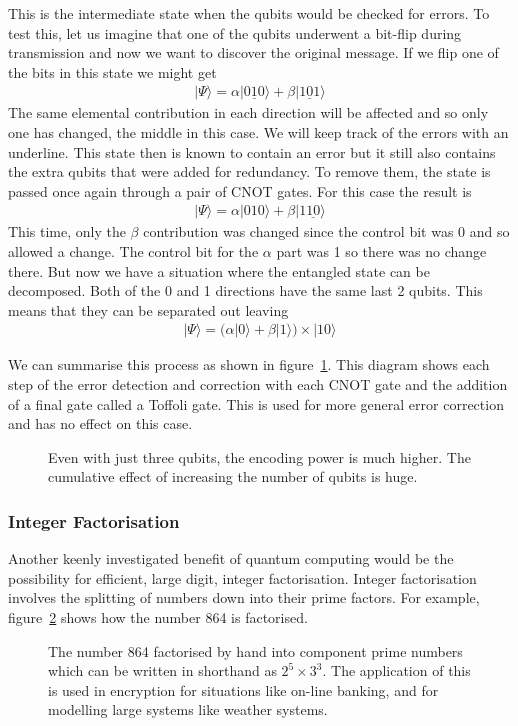 This is the intermediate state when the qubits would be checked for errors. To test this, let us imagine that one of the qubits underwent a bit-flip during transmission and now we want to discover the original message. If we flip one of the bits in this state we might get
\begin{align}
	|\Psi\rangle = \alpha|0\underline{1}0\rangle + \beta|1\underline{0}1\rangle
\end{align}
The same elemental contribution in each direction will be affected and so only one has changed, the middle in this case. We will keep track of the errors with an underline. This state then is known to contain an error but it still also contains the extra qubits that were added for redundancy. To remove them, the state is passed once again through a pair of CNOT gates. For this case the result is
\begin{align}
	|\Psi\rangle = \alpha|010\rangle + \beta|1\underline{10}\rangle
\end{align}
This time, only the $\beta$ contribution was changed since the control bit was 0 and so allowed a change. The control bit for the $\alpha$ part was 1 so there was no change there. But now we have a situation where the entangled state can be decomposed. Both of the 0 and 1 directions have the same last 2 qubits. This means that they can be separated out leaving
\begin{align}
	|\Psi\rangle = \big(\alpha|0\rangle + \beta|1\rangle\big)\times|10\rangle
\end{align}

We can summarise this process as shown in figure~\ref{fig:quantumerror}. This diagram shows each step of the error detection and correction with each CNOT gate and the addition of a final gate called a Toffoli gate. This is used for more general error correction and has no effect on this case.

\begin{figure}[ht]
	\centering
	 
	\caption{\label{fig:quantumerror}Even with just three qubits, the encoding power is much higher. The cumulative effect of increasing the number of qubits is huge.}
\end{figure}

\subsubsection{Integer Factorisation}
Another keenly investigated benefit of quantum computing would be the possibility for efficient, large digit, integer factorisation. Integer factorisation involves the splitting of numbers down into their prime factors. For example, figure~\ref{fig:factors} shows how the number 864 is factorised.
\begin{figure}[ht]
	\centering
	\caption{\label{fig:factors}The number 864 factorised by hand into component prime numbers which can be written in shorthand as $2^5 \times 3^3$. The application of this is used in encryption for situations like on-line banking, and for modelling large systems like weather systems.}
\end{figure}

